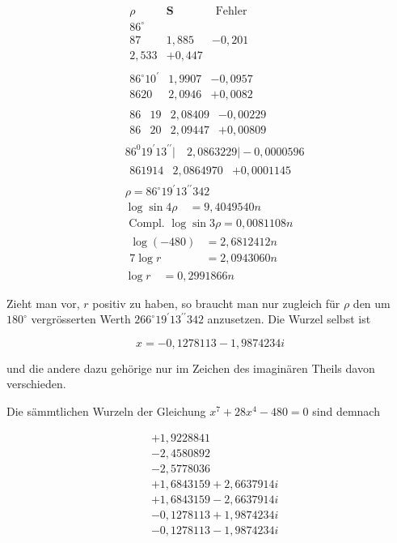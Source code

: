 \documentclass[10pt]{article}
\begin{document}
\[
\begin{aligned}
& \begin{array}{c|c|c}
\rho & \boldsymbol{S} & \text { Fehler } \\
86^{\circ} \\
87 & 1,885 & -0,201 \\
2,533 & +0,447
\end{array} \\
& \begin{array}{l|l|l}
86^{\circ} 10^{\prime} & 1,9907 & -0,0957 \\
8620 & 2,0946 & +0,0082
\end{array} \\
& \begin{array}{ll|l|l}
86 & 19 & 2,08409 & -0,00229 \\
86 & 20 & 2,09447 & +0,00809
\end{array} \\
& 86^{0} 19^{\prime} 13^{\prime \prime}|\quad 2,0863229|-0,0000596 \\
& \begin{array}{l|l|l}
861914 & 2,0864970 & +0,0001145
\end{array} \\
& \rho=86^{\circ} 19^{\prime} 13^{\prime \prime} 342 \\
& \log \sin 4 \rho \quad=9,4049540 n \\
& \text { Compl. } \log \sin 3 \rho=0,0081108 n \\
& \begin{array}{ll}
\log (-480) & =2,6812412 n \\
\hline 7 \log r & =2,0943060 n
\end{array} \\
& \log r \quad=0,2991866 n
\end{aligned}
\]

Zieht man vor, \(r\) positiv zu haben, so braucht man nur zugleich für \(\rho\) den um \(180^{\circ}\) vergrösserten Werth \(266^{\circ} 19^{\prime} 13^{\prime \prime} 342\) anzusetzen. Die Wurzel selbst ist

\[
x=-0,1278113-1,9874234 i
\]

und die andere dazu gehörige nur im Zeichen des imaginären Theils davon verschieden.

Die sämmtlichen Wurzeln der Gleichung \(x^{7}+28 x^{4}-480=0\) sind demnach

\[
\begin{aligned}
& +1,9228841 \\
& -2,4580892 \\
& -2,5778036 \\
& +1,6843159+2,6637914 i \\
& +1,6843159-2,6637914 i \\
& -0,1278113+1,9874234 i \\
& -0,1278113-1,9874234 i
\end{aligned}
\]
\end{document}
